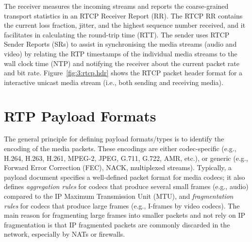 
The receiver measures the incoming streams and reports the coarse-grained
transport statistics in an RTCP Receiver Report (RR). The RTCP RR contains the
current loss fraction, jitter, and the highest sequence number received, and it
facilitates in calculating the round-trip time (RTT). The sender uses RTCP Sender Reports (SRs)
to assist in synchronising the media streams (audio and video) by relating the
RTP timestamps of the individual media streams to the wall clock time (NTP)
and notifying the receiver about the current packet rate and bit rate.
Figure~\ref{fig:3:rtcp.hdr} shows the RTCP packet header format for a
interactive unicast media stream (i.e., both sending and receiving media).

\section{RTP Payload Formats}

The general principle for defining payload formats/types is to 
identify the encoding of the media packets. These encodings are either  
codec-specific (e.g., H.264, H.263, H.261, MPEG-2, JPEG, G.711, G.722, AMR, etc.),
or generic (e.g., Forward Error Correction (FEC), NACK, multiplexed streams).
Typically, a payload document specifies a well-defined packet format for media
codecs; it also defines \emph{aggregation rules} for codecs that produce
several small frames (e.g., audio) compared to the IP Maximum Transmission
Unit (MTU), and \emph{fragmentation rules} for codecs that produce large frames
(e.g., I-frames by video codecs). The main reason for fragmenting large
frames into smaller packets and not rely on IP fragmentation is that IP
fragmented packets are commonly discarded in the network, especially by NATs
or firewalls.


